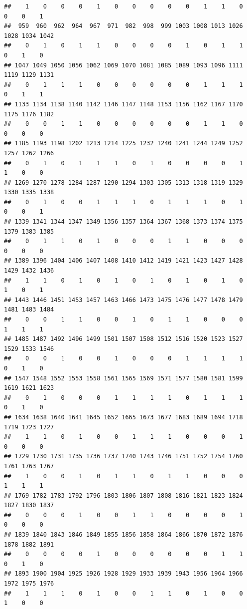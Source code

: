 \documentclass[
]{article}
\begin{document}
\begin{verbatim}
##    1    0    0    0    1    0    0    0    0    0    1    1    0    0    0    1 
##  959  960  962  964  967  971  982  998  999 1003 1008 1013 1026 1028 1034 1042 
##    0    1    0    1    1    0    0    0    0    1    0    1    1    0    1    0 
## 1047 1049 1050 1056 1062 1069 1070 1081 1085 1089 1093 1096 1111 1119 1129 1131 
##    0    1    1    1    0    0    0    0    0    0    1    1    1    0    1    1 
## 1133 1134 1138 1140 1142 1146 1147 1148 1153 1156 1162 1167 1170 1175 1176 1182 
##    0    0    1    1    0    0    0    0    0    0    1    1    0    0    0    0 
## 1185 1193 1198 1202 1213 1214 1225 1232 1240 1241 1244 1249 1252 1257 1262 1266 
##    0    1    0    1    1    1    0    1    0    0    0    0    1    1    0    0 
## 1269 1270 1278 1284 1287 1290 1294 1303 1305 1313 1318 1319 1329 1330 1335 1338 
##    0    1    0    0    1    1    1    0    1    1    1    0    1    0    0    1 
## 1339 1341 1344 1347 1349 1356 1357 1364 1367 1368 1373 1374 1375 1379 1383 1385 
##    0    1    1    0    1    0    0    0    1    1    0    0    0    0    0    0 
## 1389 1396 1404 1406 1407 1408 1410 1412 1419 1421 1423 1427 1428 1429 1432 1436 
##    1    1    0    1    0    1    0    1    0    1    0    1    0    1    0    1 
## 1443 1446 1451 1453 1457 1463 1466 1473 1475 1476 1477 1478 1479 1481 1483 1484 
##    0    0    1    1    0    0    1    0    1    1    0    0    0    1    1    1 
## 1485 1487 1492 1496 1499 1501 1507 1508 1512 1516 1520 1523 1527 1529 1533 1546 
##    0    0    1    0    0    1    0    0    0    1    1    1    1    0    1    0 
## 1547 1548 1552 1553 1558 1561 1565 1569 1571 1577 1580 1581 1599 1619 1621 1623 
##    0    1    0    0    0    1    1    1    1    0    1    1    1    0    1    0 
## 1634 1638 1640 1641 1645 1652 1665 1673 1677 1683 1689 1694 1718 1719 1723 1727 
##    1    1    0    1    0    0    1    1    1    0    0    0    1    0    0    0 
## 1729 1730 1731 1735 1736 1737 1740 1743 1746 1751 1752 1754 1760 1761 1763 1767 
##    1    0    0    1    0    1    1    0    1    1    0    0    0    1    1    1 
## 1769 1782 1783 1792 1796 1803 1806 1807 1808 1816 1821 1823 1824 1827 1830 1837 
##    0    0    0    1    0    0    1    1    0    0    0    0    1    0    0    0 
## 1839 1840 1843 1846 1849 1855 1856 1858 1864 1866 1870 1872 1876 1878 1882 1891 
##    0    0    0    0    1    0    0    0    0    0    0    1    1    0    1    0 
## 1893 1900 1904 1925 1926 1928 1929 1933 1939 1943 1956 1964 1966 1972 1975 1976 
##    1    1    1    0    1    0    0    1    1    0    1    0    0    1    0    0 

\end{verbatim}
\end{document}
